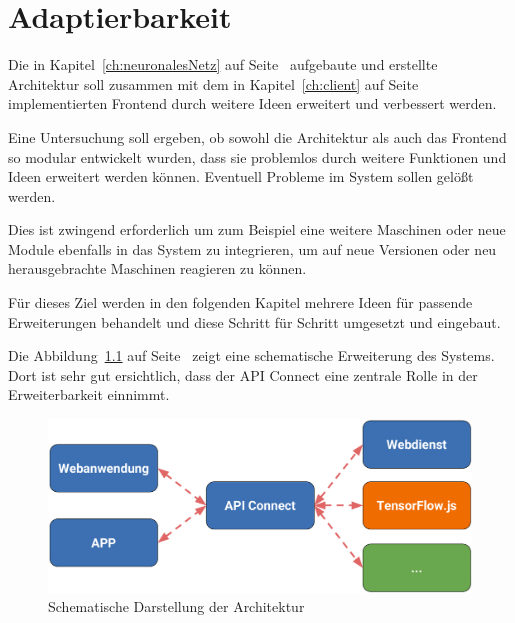\chapter{Adaptierbarkeit}
\label{ch:adaptierbarkeit}
Die in Kapitel~\ref{ch:neuronalesNetz} auf Seite~\pageref{ch:neuronalesNetz} aufgebaute und erstellte Architektur soll
zusammen mit dem in Kapitel~\ref{ch:client} auf Seite~\pageref{ch:client} implementierten Frontend durch weitere Ideen
erweitert und verbessert werden.

Eine Untersuchung soll ergeben, ob sowohl die Architektur als auch das Frontend so modular entwickelt wurden, dass sie 
problemlos durch weitere Funktionen und Ideen erweitert werden können. Eventuell Probleme im System sollen gelößt
werden.

Dies ist zwingend erforderlich um zum Beispiel eine weitere Maschinen oder neue Module ebenfalls in das System zu 
integrieren, um auf neue Versionen oder neu herausgebrachte Maschinen reagieren zu können.

Für dieses Ziel werden in den folgenden Kapitel mehrere Ideen für passende Erweiterungen behandelt und diese Schritt für 
Schritt umgesetzt und eingebaut.

Die Abbildung~\ref{fig:schematische_architektur_5} auf Seite~\pageref{fig:schematische_architektur_5} zeigt eine
schematische Erweiterung des Systems. Dort ist sehr gut ersichtlich, dass der API Connect eine zentrale Rolle in der
Erweiterbarkeit einnimmt.

\begin{figure}[h]
    \centering
    \includegraphics[width=\textwidth]{images/kapitel_5/architektur_schematisch.pdf}
    \caption{Schematische Darstellung der Architektur}
    \label{fig:schematische_architektur_5}
\end{figure}